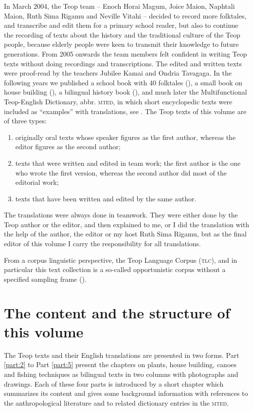 \documentclass[output=paper]{langscibook}
\begin{document}
In March 2004, the Teop team -- Enoch Horai Magum, Joice Maion, Naphtali Maion, Ruth Sima Rigamu and Neville Vitahi -- decided to record more folktales, and transcribe and edit them for a primary school reader, but also to continue the recording of texts about the history and the traditional culture of the Teop people, because elderly people were keen to transmit their knowledge to future generations. From 2005 onwards the team members felt confident in writing Teop texts without doing recordings and transcriptions. The edited and written texts were proof-read by the teachers Jubilee Kamai and Ondria Tavagaga. In the following years we published a school book with 40 folktales (\cite{Mosel:2007qo}), a small book on house building (\cite{Mahaka:2010kk}), a bilingual history book (\cite{Mosel:2014kg}), and much later the Multifunctional Teop-English Dictionary, abbr. \textsc{mted}, in which short encyclopedic texts were included as ``examples'' with translations, see \textcite{Mosel:2019bt}.
The Teop texts of this volume are of three types:
\begin{enumerate}
    \item originally oral texts whose speaker figures as the first author, whereas the editor figures as the second author;
    \item texts that were written and edited in team work; the first author is the one who wrote the first version, whereas the second author did most of the editorial work;
    \item texts that have been written and edited by the same author.
\end{enumerate}
The translations were always done in teamwork. They were either done by the Teop author or the editor, and then explained to me, or I did the translation with the help of the author, the editor or my host Ruth Sima Rigamu, but as the final editor of this volume I carry the responsibility for all translations.

From a corpus linguistic perspective, the Teop Language Corpus (\textsc{tlc}), and in particular this text collection is a so-called opportunistic corpus without a specified sampling frame (\cite[250]{Mosel:2018fb}).
\section{The content and the structure of this volume}
The Teop texts and their English translations are presented in two forms. Part \ref{part:2} to Part \ref{part:5} present the chapters on plants, house building, canoes and fishing techniques as bilingual texts in two columns with photographs and drawings. Each of these four parts is introduced by a short chapter which summarizes its content and gives some background information with references to the anthropological literature and to related dictionary entries in the \textsc{mted}.
\end{document}
